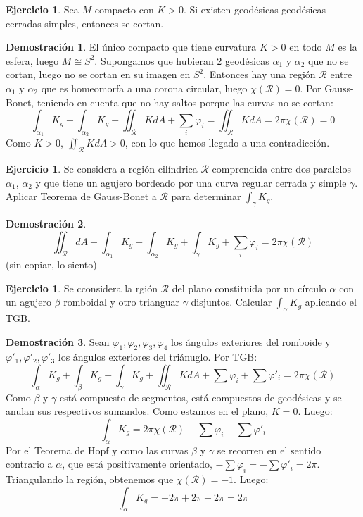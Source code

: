 \documentclass[twoside]{report}
\theoremstyle{definition}
\newtheorem{ejer}[theorem]{Ejercicio}
\newtheorem*{dem}{Demostración}
\numberwithin{equation}{section}
\begin{document}
\begin{ejer} Sea $M$ compacto con $K > 0$. Si existen geodésicas geodésicas cerradas simples, entonces se cortan.
\end{ejer}

\begin{dem} El único compacto que tiene curvatura $K > 0$ en todo $M$ es la esfera, luego $M \cong S^2$. Supongamos que hubieran 2 geodésicas $α_1$ y $α_2$ que no se cortan, luego no se cortan en su imagen en $S^2$. Entonces hay una región $\mathcal{R}$ entre $α_1$ y $α_2$ que es homeomorfa a una corona circular, luego $χ(\mathcal{R}) = 0$. Por Gauss-Bonet, teniendo en cuenta que no hay saltos porque las curvas no se cortan:
\[ \int_{α_1} K_g + \int_{α_2} K_g + \iint_\mathcal{R} K dA + \sum_i φ_i = \iint_\mathcal{R} K dA = 2 π χ(\mathcal{R}) = 0 \]
Como $K > 0$, $\iint_\mathcal{R} K dA > 0$, con lo que hemos llegado a una contradicción.
\end{dem}

\begin{ejer} Se considera a región cilíndrica $\mathcal{R}$ comprendida entre dos paralelos $α_1$, $α_2$ y que tiene un agujero bordeado por una curva regular cerrada y simple $γ$. Aplicar Teorema de Gauss-Bonet a $\mathcal{R}$ para determinar $\int_γ K_g$.
\end{ejer}

\begin{dem}
\[ \iint_\mathcal{R} dA + \int_{α_1} K_g + \int_{α_2} K_g + \int_γ K_g + \sum_i φ_i = 2 π χ(\mathcal{R}) \]
(sin copiar, lo siento)
\end{dem}

\begin{ejer}
Se cconsidera la rgión $\mathcal{R}$ del plano constituida por un círculo $α$ con un agujero $β$ romboidal y otro trianguar $γ$ disjuntos. Calcular $\int_α K_g$ aplicando el TGB.
\end{ejer}

\begin{dem} Sean $φ_1,φ_2,φ_3,φ_4$ los ángulos exteriores del romboide y  $φ'_1,φ'_2,φ'_3$ los ángulos exteriores del triánuglo. Por TGB:
\[ \int_α K_g + \int_β K_g + \int_γ K_g + \iint_\mathcal{R} K dA + \sum φ_i + \sum φ'_i = 2 π χ(\mathcal{R}) \]
Como $β$ y $γ$ está compuesto de segmentos, está compuestos de geodésicas y se anulan sus respectivos sumandos. Como estamos en el plano, $K = 0$. Luego:
\[ \int_α K_g = 2 π χ(\mathcal{R}) - \sum φ_i - \sum φ'_i \]
Por el Teorema de Hopf y como las curvas $β$ y $γ$ se recorren en el sentido contrario a $α$, que está positivamente orientado, $-\sum φ_i = -\sum φ'_i = 2π$. Triangulando la región, obtenemos que $χ(\mathcal{R})=-1$. Luego:
\[ \int_α K_g = -2π+2π+2π = 2π \]
\end{dem}
\end{document}
